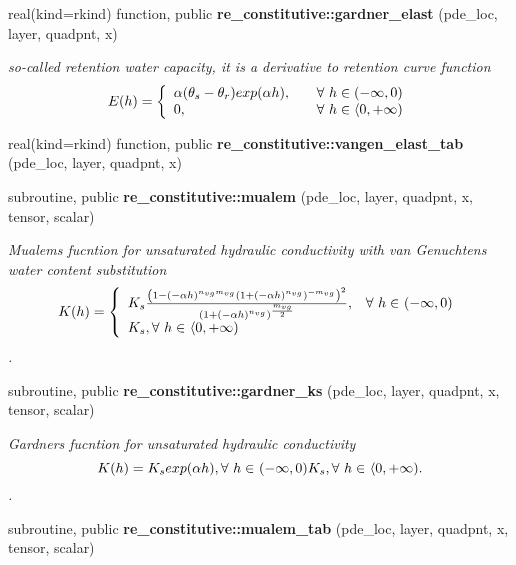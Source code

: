 \begin{DoxyCompactItemize}
real(kind=rkind) function, public {\bf re\+\_\+constitutive\+::gardner\+\_\+elast} (pde\+\_\+loc, layer, quadpnt, x)
\begin{DoxyCompactList}\small\item\em so-\/called retention water capacity, it is a derivative to retention curve function \[ E(h) = \left\{ \begin{array}{l l} \alpha (\theta_s - \theta_r) exp(\alpha h) , & \quad \mbox{$\forall$ $h \in (-\infty, 0 )$}\\ 0, & \quad \mbox{$\forall$ $h \in \langle 0, + \infty )$}\\ \end{array} \right. \] \end{DoxyCompactList}\item 
real(kind=rkind) function, public {\bf re\+\_\+constitutive\+::vangen\+\_\+elast\+\_\+tab} (pde\+\_\+loc, layer, quadpnt, x)
\item 
subroutine, public {\bf re\+\_\+constitutive\+::mualem} (pde\+\_\+loc, layer, quadpnt, x, tensor, scalar)
\begin{DoxyCompactList}\small\item\em Mualem\textquotesingle{}s fucntion for unsaturated hydraulic conductivity with van Genuchten\textquotesingle{}s water content substitution \[ K(h) = \left\{ \begin{array}{l l} K_s\frac{\left( 1- (-\alpha h)^{n_{vg}m_{vg}} \left( 1+ (-\alpha h)^{n_{vg}} \right)^{-m_{vg}} \right)^2}{\left(1+(-\alpha h)^{n_{vg}} \right)^{\frac{m_{vg}}{2}}}, & \mbox{$\forall$ $h \in$ $(-\infty,0)$}\\ K_s, \mbox{$\forall$ $h \in$ $\langle 0, +\infty)$}\\ \end{array} \right. \]. \end{DoxyCompactList}\item 
subroutine, public {\bf re\+\_\+constitutive\+::gardner\+\_\+ks} (pde\+\_\+loc, layer, quadpnt, x, tensor, scalar)
\begin{DoxyCompactList}\small\item\em Gardner\textquotesingle{}s fucntion for unsaturated hydraulic conductivity \[ K(h) = K_s exp(\alpha h), \mbox{$\forall$ $h \in$ $(-\infty,0)$}\\ K_s, \mbox{$\forall$ $h \in$ $\langle 0, +\infty)$}. \]. \end{DoxyCompactList}\item 
subroutine, public {\bf re\+\_\+constitutive\+::mualem\+\_\+tab} (pde\+\_\+loc, layer, quadpnt, x, tensor, scalar)

\end{DoxyCompactItemize}

